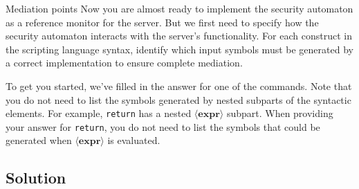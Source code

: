 \documentclass[11pt]{article}
\begin{document}
\newpage
\begin{problem}{Mediation points}
	Now you are almost ready to implement the security automaton as a reference monitor for the server. But we first need to specify how the security automaton interacts with the server's functionality. For each construct in the scripting language syntax, identify which input symbols must be generated by a correct implementation to ensure complete mediation. 

	To get you started, we've filled in the answer for one of the commands. Note that you do not need to list the symbols generated by nested subparts of the syntactic elements. For example, \texttt{return} has a nested $\langle\mathbf{expr}\rangle$ subpart. When providing your answer for \texttt{return}, you do not need to list the symbols that could be generated when $\langle\mathbf{expr}\rangle$ is evaluated.

\subsection*{Solution}


\end{problem}
\end{document}
